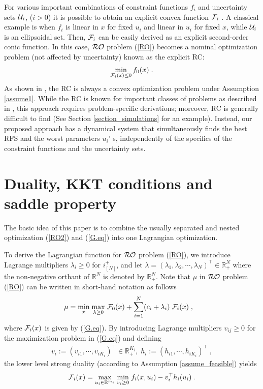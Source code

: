 \documentclass[journal,twoside,web]{ieeecolor}
\begin{document}
For various important combinations of constraint functions $f_i$ and uncertainty sets ${\cal U}_i$, ($i>0$) it is possible to obtain an explicit convex function ${\cal F}_i$ \cite{bental2009}. A classical example is when $f_i$ is linear in $x$ for fixed $u_i$ and linear in $u_i$ for fixed $x$, while ${\cal U}_i$ is an ellipsoidal set.
Then, ${\cal F}_i$ can be easily derived as an explicit second-order conic function.
In this case, ${\cal RO}$ problem (\ref{RO}) becomes a nominal optimization problem (not affected by uncertainty) known as the explicit RC:
\begin{align} \label{rc}
\displaystyle \min_{{\cal F}_i(x)\leq 0} f_0(x)\;.
\end{align}
As shown in \cite{bental2009-2}, the RC is always a convex optimization problem under Assumption \ref{assume1}. While the RC is known for important classes of problems as described in \cite{bertsimas2011}, this approach requires problem-specific derivations; moreover, RC is generally difficult to find (See Section \ref{section_simulations} for an example). Instead, our proposed approach has a dynamical system that simultaneously finds the best RFS and the worst parameters $u_i$' s, independently of the specifics of the constraint functions and the uncertainty sets.


\section{Duality, KKT conditions and saddle property} \label{section_saddle}
The basic idea of this paper is to combine the usually separated and nested optimization (\ref{RO2}) and (\ref{G.eq}) into one Lagrangian optimization.

To derive the Lagrangian function for ${\cal RO}$ problem (\ref{RO}), we introduce Lagrange multipliers $\lambda_i\geq 0$ for $i^+_{[N]}$, and let $\lambda=(\lambda_1,\lambda_2,\cdots,\lambda_N)^\top \in \mathbb{R}_+^N$ where the non-negative orthant of $\mathbb{R}^N$ is denoted by $\mathbb{R}_+^N$. Note that $\mu$ in ${\cal RO}$ problem (\ref{RO}) can be written in short-hand notation  as follows
\begin{align}
\mu=&\;\underset{x}{\min}\;\underset{\lambda\geq 0}{\max}\; {\cal F}_0(x)+\sum_{i=1}^N (c_i+\lambda_i) \; {\cal F}_i(x)\;,
 \label{upper_ro}
\end{align}
where ${\cal F}_i(x)$ is given by (\ref{G.eq}).
 By introducing Lagrange multipliers $v_{ij} \geq 0$ for the maximization problem in (\ref{G.eq}) and defining
\begin{align*}
v_i:=(v_{i1},\cdots, v_{iK_i})^\top \in \mathbb{R}_+^{K_i},\;h_i:=(h_{i1},\cdots, h_{iK_i})^\top\;,\nonumber
\end{align*}
the lower level strong duality (according to Assumption \ref{assume_feasible}) yields
\begin{align} \label{lower_ro}
{\cal F}_i(x)=\underset{u_i\in \mathbb{R}^{m_i}}{\max}\;\underset{v_{i}\geq 0}{\min}\;f_i(x,u_i)-v_i^\top h_{i}(u_i)\;.
\end{align}
\end{document}
